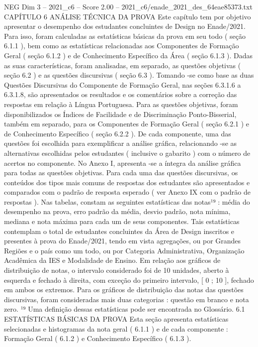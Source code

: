 \begin{textsample}{NEG Dim 3 – 2021\_c6 – Score 2.00 – 2021\_c6/enade\_2021\_des\_64eae85373.txt}  \label{ex:f3_neg_236}
CAPÍTULO 6 ANÁLISE TÉCNICA DA PROVA Este capítulo tem por objetivo apresentar o desempenho dos estudantes concluintes de Design no Enade/2021.
Para isso, foram calculadas as estatísticas básicas da prova em seu todo ( seção 6.1.1 ), bem como as estatísticas relacionadas aos Componentes de Formação Geral ( seção 6.1.2 ) e de Conhecimento Específico da Área ( seção 6.1.3 ).
Dadas as suas características, foram analisadas, em separado, as questões objetivas ( seção 6.2 ) e as questões discursivas ( seção 6.3 ).
Tomando -se como base as duas Questões Discursivas do Componente de Formação Geral, nas seções 6.3.1.6 a 6.3.1.8, são apresentados os resultados e os comentários sobre a correção das respostas em relação à Língua Portuguesa.
Para as questões objetivas, foram disponibilizados os Índices de Facilidade e de Discriminação Ponto-Bisserial, também em separado, para os Componentes de Formação Geral ( seção 6.2.1 ) e de Conhecimento Específico ( seção 6.2.2 ).
De cada componente, uma das questões foi escolhida para exemplificar a análise gráfica, relacionando -se as alternativas escolhidas pelos estudantes ( inclusive o gabarito ) com o número de acertos no componente.
No Anexo I, apresenta -se a íntegra da análise gráfica para todas as questões objetivas.
Para cada uma das questões discursivas, os conteúdos dos tipos mais comuns de respostas dos estudantes são apresentados e comparados com o padrão de resposta esperado ( ver Anexo IX com o padrão de respostas ).
Nas tabelas, constam as seguintes estatísticas das notas¹⁹ : média do desempenho na prova, erro padrão da média, desvio padrão, nota mínima, mediana e nota máxima para cada um de seus componentes.
Tais estatísticas contemplam o total de estudantes concluintes da Área de Design inscritos e presentes à prova do Enade/2021, tendo em vista agregações, ou por Grandes Regiões e o país como um todo, ou por Categoria Administrativa, Organização Acadêmica da IES e Modalidade de Ensino.
Em relação aos gráficos de distribuição de notas, o intervalo considerado foi de 10 unidades, aberto à esquerda e fechado à direita, com exceção do primeiro intervalo, [ 0 ; 10 ], fechado em ambos os extremos.
Para os gráficos de distribuição das notas das questões discursivas, foram consideradas mais duas categorias : questão em branco e nota zero. ¹⁹ Uma definição dessas estatísticas pode ser encontrada no Glossário. 6.1 ESTATÍSTICAS BÁSICAS DA PROVA Esta seção apresenta estatísticas selecionadas e histogramas da nota geral ( 6.1.1 ) e de cada componente : Formação Geral ( 6.1.2 ) e Conhecimento Específico ( 6.1.3 ).

\end{textsample}
